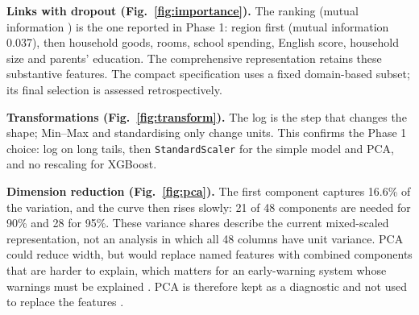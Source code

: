 \documentclass[conference,a4paper]{IEEEtran}
\newcommand{\var}[1]{\texttt{#1}}
\begin{document}
\textbf{Links with dropout (Fig.~\ref{fig:importance}).} The ranking (mutual information \cite{kraskov}) is the one reported in Phase 1: region first (mutual information 0.037), then household goods, rooms, school spending, English score, household size and parents' education. The comprehensive representation retains these substantive features. The compact specification uses a fixed domain-based subset; its final selection is assessed retrospectively.

\textbf{Transformations (Fig.~\ref{fig:transform}).} The log is the step that changes the shape; Min--Max and standardising only change units. This confirms the Phase 1 choice: log on long tails, then \var{StandardScaler} for the simple model and PCA, and no rescaling for XGBoost.

\textbf{Dimension reduction (Fig.~\ref{fig:pca}).} The first component captures 16.6\% of the variation, and the curve then rises slowly: 21 of 48 components are needed for 90\% and 28 for 95\%. These variance shares describe the current mixed-scaled representation, not an analysis in which all 48 columns have unit variance. PCA could reduce width, but would replace named features with combined components that are harder to explain, which matters for an early-warning system whose warnings must be explained \cite{shap}. PCA is therefore kept as a diagnostic and not used to replace the features \cite{jolliffe}.

\end{document}
